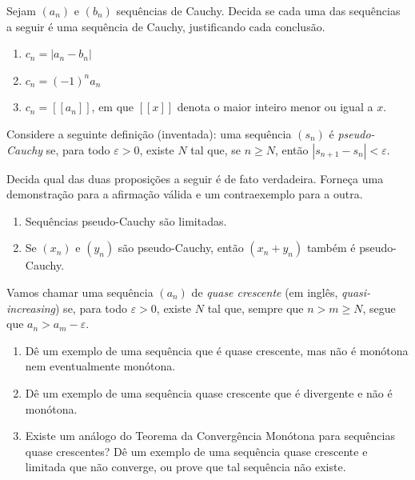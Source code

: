 \begin{exercise}\label{ex:2-6-4}
Sejam $(a_n)$ e $(b_n)$ sequências de Cauchy. Decida se cada uma das sequências a seguir é uma sequência de Cauchy, justificando cada conclusão.
\begin{enumerate}[label=\alph*)]
\item $c_n = |a_n - b_n|$
\item $c_n = (-1)^n a_n$
\item $c_n = [[a_n]]$, em que $[[x]]$ denota o maior inteiro menor ou igual a $x$.
\end{enumerate}
\end{exercise}

\begin{exercise}\label{ex:2-6-5}
Considere a seguinte definição (inventada): uma sequência $(s_n)$ é \textit{pseudo-Cauchy} se, para todo $\varepsilon > 0$, existe $N$ tal que, se $n \geq N$, então $|s_{n+1} - s_n| < \varepsilon$.

Decida qual das duas proposições a seguir é de fato verdadeira. Forneça uma demonstração para a afirmação válida e um contraexemplo para a outra.
\begin{enumerate}[label=(\roman*)]
\item Sequências pseudo-Cauchy são limitadas.
\item Se $(x_n)$ e $(y_n)$ são pseudo-Cauchy, então $(x_n + y_n)$ também é pseudo-Cauchy.
\end{enumerate}
\end{exercise}

\begin{exercise}\label{ex:2-6-6}
Vamos chamar uma sequência $(a_n)$ de \textit{quase crescente} (em inglês, \textit{quasi-increasing}) se, para todo $\varepsilon > 0$, existe $N$ tal que, sempre que $n > m \geq N$, segue que $a_n > a_m - \varepsilon$.
\begin{enumerate}[label=\alph*)]
\item Dê um exemplo de uma sequência que é quase crescente, mas não é monótona nem eventualmente monótona.
\item Dê um exemplo de uma sequência quase crescente que é divergente e não é monótona.
\item Existe um análogo do Teorema da Convergência Monótona para sequências quase crescentes? Dê um exemplo de uma sequência quase crescente e limitada que não converge, ou prove que tal sequência não existe.
\end{enumerate}
\end{exercise}

